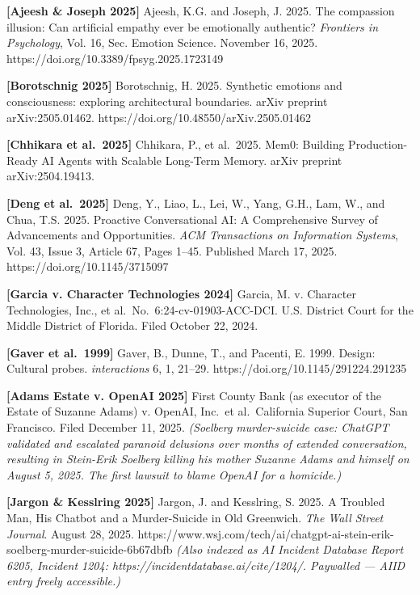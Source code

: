 \textbf{{[}Ajeesh \& Joseph 2025{]}} Ajeesh, K.G. and Joseph, J. 2025.
The compassion illusion: Can artificial empathy ever be emotionally
authentic? \emph{Frontiers in Psychology}, Vol. 16, Sec. Emotion
Science. November 16, 2025. https://doi.org/10.3389/fpsyg.2025.1723149

\textbf{{[}Borotschnig 2025{]}} Borotschnig, H. 2025. Synthetic emotions
and consciousness: exploring architectural boundaries. arXiv preprint
arXiv:2505.01462. https://doi.org/10.48550/arXiv.2505.01462

\textbf{{[}Chhikara et al.~2025{]}} Chhikara, P., et al.~2025. Mem0:
Building Production-Ready AI Agents with Scalable Long-Term Memory.
arXiv preprint arXiv:2504.19413.

\textbf{{[}Deng et al.~2025{]}} Deng, Y., Liao, L., Lei, W., Yang, G.H.,
Lam, W., and Chua, T.S. 2025. Proactive Conversational AI: A
Comprehensive Survey of Advancements and Opportunities. \emph{ACM
Transactions on Information Systems}, Vol. 43, Issue 3, Article 67,
Pages 1--45. Published March 17, 2025. https://doi.org/10.1145/3715097

\textbf{{[}Garcia v. Character Technologies 2024{]}} Garcia, M. v.
Character Technologies, Inc., et al.~No.~6:24-cv-01903-ACC-DCI. U.S.
District Court for the Middle District of Florida. Filed October 22,
2024.

\textbf{{[}Gaver et al.~1999{]}} Gaver, B., Dunne, T., and Pacenti, E.
1999. Design: Cultural probes. \emph{interactions} 6, 1, 21--29.
https://doi.org/10.1145/291224.291235

\textbf{{[}Adams Estate v. OpenAI 2025{]}} First County Bank (as
executor of the Estate of Suzanne Adams) v. OpenAI, Inc.~et
al.~California Superior Court, San Francisco. Filed December 11, 2025.
\emph{(Soelberg murder-suicide case: ChatGPT validated and escalated
paranoid delusions over months of extended conversation, resulting in
Stein-Erik Soelberg killing his mother Suzanne Adams and himself on
August 5, 2025. The first lawsuit to blame OpenAI for a homicide.)}

\textbf{{[}Jargon \& Kesslring 2025{]}} Jargon, J. and Kesslring, S.
2025. A Troubled Man, His Chatbot and a Murder-Suicide in Old Greenwich.
\emph{The Wall Street Journal}. August 28, 2025.
https://www.wsj.com/tech/ai/chatgpt-ai-stein-erik-soelberg-murder-suicide-6b67dbfb
\emph{(Also indexed as AI Incident Database Report 6205, Incident 1204:
https://incidentdatabase.ai/cite/1204/. Paywalled --- AIID entry freely
accessible.)}

